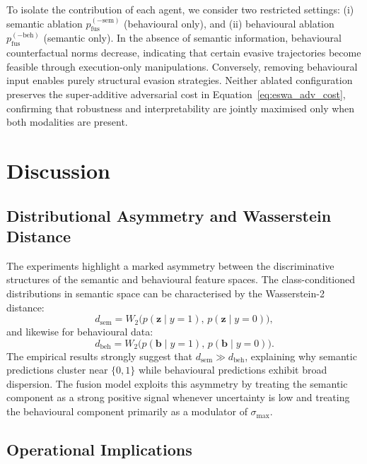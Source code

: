 To isolate the contribution of each agent, we consider two restricted settings: (i) semantic ablation $p_\text{fus}^{(-\text{sem})}$ (behavioural only), and (ii) behavioural ablation $p_\text{fus}^{(-\text{beh})}$ (semantic only). In the absence of semantic information, behavioural counterfactual norms decrease, indicating that certain evasive trajectories become feasible through execution-only manipulations. Conversely, removing behavioural input enables purely structural evasion strategies. Neither ablated configuration preserves the super-additive adversarial cost in Equation~\eqref{eq:eswa_adv_cost}, confirming that robustness and interpretability are jointly maximised only when both modalities are present.


\section{Discussion}
\label{sec:eswa_discussion}

\subsection{Distributional Asymmetry and Wasserstein Distance}

The experiments highlight a marked asymmetry between the discriminative structures of the semantic and behavioural feature spaces. The class-conditioned distributions in semantic space can be characterised by the Wasserstein-2 distance:
\begin{equation}
d_\text{sem} = W_2\bigl(p(\mathbf{z} \mid y=1),\, p(\mathbf{z} \mid y=0)\bigr),
\label{eq:eswa_wass_sem}
\end{equation}
and likewise for behavioural data:
\begin{equation}
d_\text{beh} = W_2\bigl(p(\mathbf{b} \mid y=1),\, p(\mathbf{b} \mid y=0)\bigr).
\label{eq:eswa_wass_beh}
\end{equation}
The empirical results strongly suggest that $d_\text{sem} \gg d_\text{beh}$, explaining why semantic predictions cluster near $\{0,1\}$ while behavioural predictions exhibit broad dispersion. The fusion model exploits this asymmetry by treating the semantic component as a strong positive signal whenever uncertainty is low and treating the behavioural component primarily as a modulator of $\sigma_\text{max}$.

\subsection{Operational Implications}

